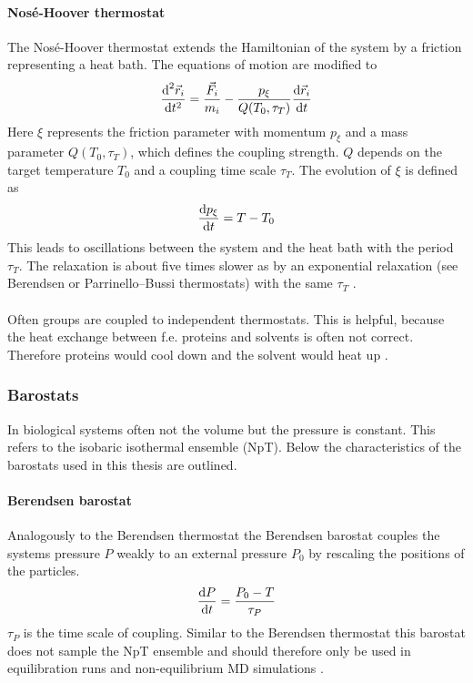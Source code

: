 \paragraph{Nosé-Hoover thermostat}
The Nosé-Hoover thermostat \autocites{nosehooverthermo}{nosehooverthermo2} extends the Hamiltonian of the system by a friction representing a heat bath. The equations of motion are modified to
\begin{equation}
\frac{\text{d}^2 \vec{r}_i}{\text{d} t^2} = \frac{\vec{F}_i}{m_i} - \frac{p_\xi}{Q(T_0, \tau_T)}\frac{\text{d} \vec{r}_i}{\text{d} t}
\end{equation}
Here $\xi$ represents the friction parameter with momentum $p_\xi$ and a mass parameter $Q(T_0, \tau_T)$, which defines the coupling strength. $Q$ depends on the target temperature $T_0$ and a coupling time scale $\tau_T$. The evolution of $\xi$ is defined as
\begin{equation}
\frac{\text{d} p_\xi}{\text{d} t} = T - T_0
\end{equation}
This leads to oscillations between the system and the heat bath with the period $\tau_T$. The relaxation is about five times slower as by an exponential relaxation (see Berendsen or Parrinello–Bussi thermostats) with the same $\tau_T$ \autocite[p. 32f]{gromacsManual}.\\
\\
Often groups are coupled to independent thermostats. This is helpful, because the heat exchange between f.e. proteins and solvents is often not correct. Therefore proteins would cool down and the solvent would heat up \autocite[p. 34]{gromacsManual}.
\subsubsection{Barostats}
In biological systems often not the volume but the pressure is constant. This refers to the isobaric isothermal ensemble (NpT). Below the characteristics of the barostats used in this thesis are outlined.
\paragraph{Berendsen barostat}
Analogously to the Berendsen thermostat the Berendsen barostat \autocite{berendsen} couples the systems pressure $P$ weakly to an external pressure $P_0$ by rescaling the positions of the particles.\\
\begin{equation}
\label{eq:berendsen_pressure_time_evolving}
\frac{\text{d} P}{\text{d} t} = \frac{P_0 - T}{\tau_P}
\end{equation}
$\tau_P$ is the time scale of coupling. Similar to the Berendsen thermostat this barostat does not sample the NpT ensemble and should therefore only be used in equilibration runs and non-equilibrium MD simulations \autocite[p. 36]{gromacsManual}.
